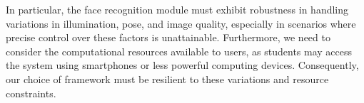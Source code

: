 \documentclass[class=report, crop=false, a4paper, 12pt]{standalone}
\begin{document}
\par In particular, the face recognition module must exhibit robustness in handling variations in illumination, pose, and image quality, especially in scenarios where precise control over these factors is unattainable. Furthermore, we need to consider the computational resources available to users, as students may access the system using smartphones or less powerful computing devices. Consequently, our choice of framework must be resilient to these variations and resource constraints.
\end{document}
